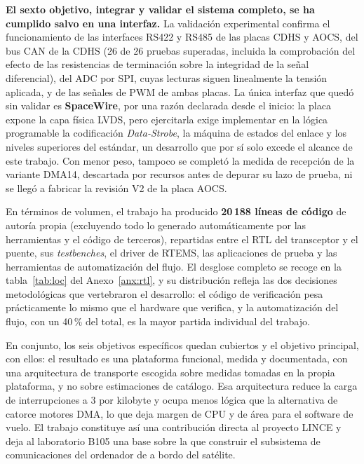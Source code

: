 \textbf{El sexto objetivo, integrar y validar el sistema completo, se ha cumplido salvo en una
interfaz.} La validación experimental confirma el funcionamiento de las interfaces RS422 y RS485 de
las placas CDHS y AOCS, del bus CAN de la CDHS (26 de 26 pruebas superadas, incluida la
comprobación del efecto de las resistencias de terminación sobre la integridad de la señal
diferencial), del ADC por SPI, cuyas lecturas siguen linealmente la tensión aplicada, y de las
señales de PWM de ambas placas. La única interfaz que quedó sin validar es \textbf{SpaceWire}, por
una razón declarada desde el inicio: la placa expone la capa física LVDS, pero ejercitarla exige
implementar en la lógica programable la codificación \textit{Data-Strobe}, la máquina de estados
del enlace y los niveles superiores del estándar, un desarrollo que por sí solo excede el alcance
de este trabajo. Con menor peso, tampoco se completó la medida de recepción de la variante DMA14,
descartada por recursos antes de depurar su lazo de prueba, ni se llegó a fabricar la revisión V2
de la placa AOCS.

En términos de volumen, el trabajo ha producido \textbf{20\,188 líneas de código} de autoría propia
(excluyendo todo lo generado automáticamente por las herramientas y el código de terceros),
repartidas entre el RTL del transceptor y el puente, sus \textit{testbenches}, el driver de RTEMS,
las aplicaciones de prueba y las herramientas de automatización del flujo. El desglose completo se
recoge en la tabla~\ref{tab:loc} del Anexo~\ref{anx:rtl}, y su distribución refleja las dos decisiones
metodológicas que vertebraron el desarrollo: el código de verificación pesa prácticamente lo mismo
que el hardware que verifica, y la automatización del flujo, con un 40\,\% del total, es la mayor
partida individual del trabajo.

En conjunto, los seis objetivos específicos quedan cubiertos y el objetivo principal, con ellos: el
resultado es una plataforma funcional, medida y documentada, con una arquitectura de transporte
escogida sobre medidas tomadas en la propia plataforma, y no sobre estimaciones de catálogo. Esa arquitectura reduce la carga de
interrupciones a 3 por kilobyte y ocupa menos lógica que la alternativa de catorce motores DMA, lo
que deja margen de CPU y de área para el software de vuelo. El trabajo constituye así una
contribución directa al proyecto LINCE y deja al laboratorio B105 una base sobre la que construir
el subsistema de comunicaciones del ordenador de a bordo del satélite.
